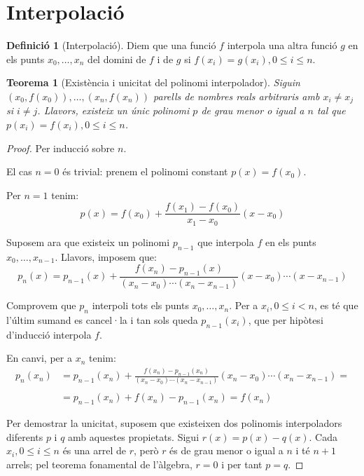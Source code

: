 \documentclass[a4paper,12pt]{article}
\theoremstyle{definition}
\newtheorem{definition}{Definició}
\theoremstyle{plain}
\newtheorem{theorem}{Teorema}[section]
\theoremstyle{remark}
\begin{document}
\section{Interpolació}

\begin{definition}[Interpolació]
Diem que una funció $f$ interpola una altra funció $g$ en els punts
$x_0,\allowbreak\dots,\allowbreak x_n$ del domini de $f$ i de $g$ si
$f(x_i) = g(x_i),\allowbreak 0\leq i\leq n$.
\end{definition}

\begin{theorem}[Existència i unicitat del polinomi interpolador]
Siguin $(x_0, f(x_0)),\allowbreak\dots,\allowbreak(x_n, f(x_n))$ parells de
nombres reals arbitraris amb $x_i \neq x_j$ si $i \neq j$. Llavors, existeix un
únic polinomi $p$ de grau menor o igual a $n$ tal que
$p(x_i) = f(x_i),\allowbreak 0\leq i\leq n$.
\end{theorem}

\begin{proof}
Per inducció sobre $n$.

El cas $n=0$ és trivial: prenem el polinomi constant $p(x)=f(x_0)$.

Per $n=1$ tenim:
\begin{equation*}
p(x)=f(x_0)+\frac{f(x_1)-f(x_0)}{x_1-x_0}(x-x_0)
\end{equation*}

Suposem ara que existeix un polinomi $p_{n-1}$ que interpola $f$ en els punts
$x_0,\allowbreak\dots,\allowbreak x_{n-1}$. Llavors, imposem que:
\begin{equation*}
p_n(x) = p_{n-1}(x) + \frac{f(x_n)-p_{n-1}(x)}{(x_n-x_0)\cdots(x_n-x_{n-1})}
(x-x_0)\cdots(x-x_{n-1})
\end{equation*}

Comprovem que $p_n$ interpoli tots els punts
$x_0,\allowbreak\dots,\allowbreak x_n$. Per a $x_i, 0\leq i< n$, es té que
l'últim sumand es cancel·la i tan sols queda $p_{n-1}(x_i)$, que per hipòtesi
d'inducció interpola $f$.

En canvi, per a $x_n$ tenim:
\begin{equation*}
\begin{split}
p_n(x_n) &= p_{n-1}(x_n) + \frac{f(x_n)-p_{n-1}(x_n)}
{(x_n-x_0)\cdots(x_n-x_{n-1})}
(x_n-x_0)\cdots(x_n-x_{n-1}) =\\\\
&= p_{n-1}(x_n) + f(x_n) - p_{n-1}(x_n) = f(x_n)
\end{split}
\end{equation*}

Per demostrar la unicitat, suposem que existeixen dos polinomis interpoladors
diferents $p$ i $q$ amb aquestes propietats. Sigui $r(x)=p(x)-q(x)$.
Cada $x_i, 0\leq i\leq n$ és una arrel de $r$, però $r$ és de grau menor o
igual a $n$ i té $n+1$ arrels; pel teorema fonamental de l'àlgebra, $r=0$ i
per tant $p=q$.
\end{proof}\newpage
\end{document}
